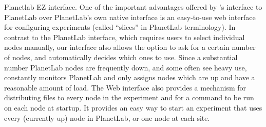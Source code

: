 \begin{asparadesc}
\item[Planetlab EZ interface.]
One of the important advantages offered by \emulab's interface to PlanetLab
over PlanetLab's own native interface is an easy-to-use web interface for
configuring experiments (called ``slices'' in PlanetLab terminology).  In
contrast to the PlanetLab interface, which requires users to select individual
nodes manually, our interface also allows the option to ask for a certain
number of nodes, and \emulab automatically decides which ones to use.  Since a
substantial number PlanetLab nodes are frequently down, and some often see
heavy use, \emulab constantly monitors PlanetLab and only assigns nodes which
are up and have a reasonable amount of load.  The Web interface also provides a
mechanism for distributing files to every node in the experiment and for a
command to be run on each node at startup.  It provides an easy way to start an
experiment that uses every (currently up) node in PlanetLab, or one node at
each site.

\end{asparadesc}


